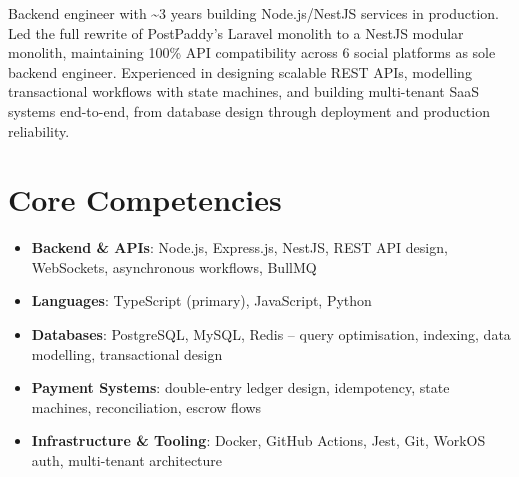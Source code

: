 \documentclass[11pt,a4paper,sans]{moderncv}
\begin{document}
\makecvtitle


\vspace{6pt}
\small{Backend engineer with \textasciitilde3 years building Node.js/NestJS services in production. Led the full rewrite of PostPaddy's Laravel monolith to a NestJS modular monolith, maintaining 100\% API compatibility across 6 social platforms as sole backend engineer. Experienced in designing scalable REST APIs, modelling transactional workflows with state machines, and building multi-tenant SaaS systems end-to-end, from database design through deployment and production reliability.}


\section{Core Competencies}
\vspace{1pt}
\begin{itemize}

\item \textbf{Backend \& APIs}: Node.js, Express.js, NestJS, REST API design, WebSockets, asynchronous workflows, BullMQ

\item \textbf{Languages}: TypeScript (primary), JavaScript, Python

\item \textbf{Databases}: PostgreSQL, MySQL, Redis -- query optimisation, indexing, data modelling, transactional design

\item \textbf{Payment Systems}: double-entry ledger design, idempotency, state machines, reconciliation, escrow flows

\item \textbf{Infrastructure \& Tooling}: Docker, GitHub Actions, Jest, Git, WorkOS auth, multi-tenant architecture

\end{itemize}

\end{document}
